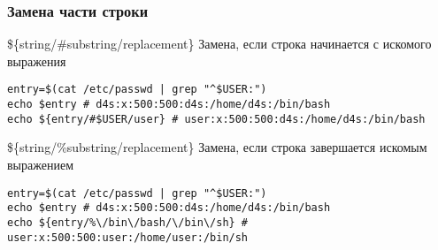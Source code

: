 \begin{frame}[fragile]
	\frametitle{Замена части строки}

	\begin{block}{\$\{string/\#substring/replacement\}}
		Замена, если строка начинается с искомого выражения

	\begin{lstlisting}
entry=$(cat /etc/passwd | grep "^$USER:")
echo $entry # d4s:x:500:500:d4s:/home/d4s:/bin/bash
echo ${entry/#$USER/user} # user:x:500:500:d4s:/home/d4s:/bin/bash
	\end{lstlisting}
	\end{block}

	\pause
	\begin{block}{\$\{string/\%substring/replacement\}}
		Замена, если строка завершается искомым выражением

	\begin{lstlisting}
entry=$(cat /etc/passwd | grep "^$USER:")
echo $entry # d4s:x:500:500:d4s:/home/d4s:/bin/bash
echo ${entry/%\/bin\/bash/\/bin\/sh} # user:x:500:500:user:/home/user:/bin/sh
	\end{lstlisting}
	\end{block}

\end{frame}

